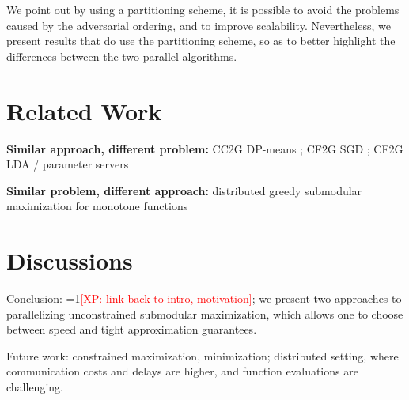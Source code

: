 \documentclass{article} %
\newcommand{\hogwild}{CF2G}
\newcommand{\occ}{CC2G}
\newcommand{\Comments}{1}
\newcommand{\note}[2]{\ifnum\Comments=1\textcolor{#1}{#2}\fi}
\newcommand{\xinghao}[1]{\note{red}{[XP: #1]}}
\begin{document}
We point out by using a partitioning scheme, it is possible to avoid the problems caused by the adversarial ordering, and to improve scalability.
Nevertheless, we present results that do use the partitioning scheme, so as to better highlight the differences between the two parallel algorithms.









\section{Related Work}
\textbf{Similar approach, different problem: } \occ{} DP-means \cite{pan2013}; \hogwild{} SGD \cite{Recht11}; \hogwild{} LDA \cite{Ahmed12} / parameter servers \cite{li2013, ho2013}

\textbf{Similar problem, different approach: } distributed greedy submodular maximization for monotone functions \cite{Mirzasoleiman2013}






\section{Discussions}

Conclusion: \xinghao{link back to intro, motivation}; we present two approaches to parallelizing unconstrained submodular maximization, which allows one to choose between speed and tight approximation guarantees.

Future work: constrained maximization, minimization; distributed setting, where communication costs and delays are higher, and function evaluations are challenging.


{\footnotesize




}
\end{document}

